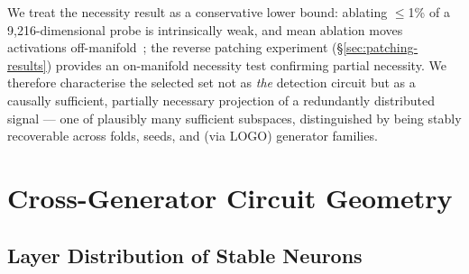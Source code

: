 \documentclass[11pt]{article}
\begin{document}
We treat the necessity result as a conservative lower bound: ablating $\leq$1\% of a 9{,}216-dimensional probe is intrinsically weak, and mean ablation moves activations off-manifold~\citep{heimersheim2024patching}; the reverse patching experiment (§\ref{sec:patching-results}) provides an on-manifold necessity test confirming partial necessity. We therefore characterise the selected set not as \textit{the} detection circuit but as a causally sufficient, partially necessary projection of a redundantly distributed signal --- one of plausibly many sufficient subspaces, distinguished by being stably recoverable across folds, seeds, and (via LOGO) generator families.

\begin{table}[t]
\centering
{}%
\caption{Mean-ablation accuracy drop at $k = \text{full}$, 15-cell means $\pm$ std (positive = drop). Sel.\ drop: ablating the stable set; Rand.\ drop: mean over 20 random $k$-subsets. Cohere is the only generator substantially above the random baseline.}
\label{tab:ablation-full}
\end{table}

\section{Cross-Generator Circuit Geometry}
\label{sec:results-crossgen}

\subsection{Layer Distribution of Stable Neurons}
\label{sec:crossgen-layers}
\end{document}
